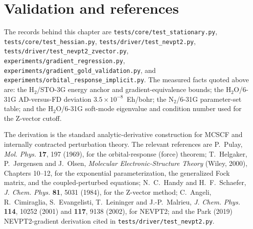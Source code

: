 \section{Validation and references}
\label{sec:chain-validation}

{\raggedright
The records behind this chapter are
\texttt{tests/core/test\_stationary.py},
\texttt{tests/core/test\_hessian.py},
\texttt{tests/driver/test\_nevpt2.py},
\texttt{tests/driver/test\_nevpt2\_zvector.py},
\texttt{experiments/gradient\_regression.py},
\texttt{experiments/gradient\_gold\_validation.py}, and
\texttt{experiments/orbital\_response\_implicit.py}.  The measured
facts quoted above are: the H$_2$/STO-3G energy anchor and
gradient-equivalence bounds; the H$_2$O/6-31G AD-versus-FD deviation
$3.5\times10^{-8}$~Eh/bohr; the N$_2$/6-31G parameter-set table; and
the H$_2$O/6-31G soft-mode eigenvalue and condition number used for the
Z-vector cutoff.\par}

The derivation is the standard analytic-derivative construction for
MCSCF and internally contracted perturbation theory.  The relevant
references are P.~Pulay, \emph{Mol. Phys.} \textbf{17}, 197 (1969), for
the orbital-response (force) theorem; T.~Helgaker, P.~J{\o}rgensen and
J.~Olsen, \emph{Molecular Electronic-Structure Theory} (Wiley, 2000),
Chapters 10--12, for the exponential parameterization, the generalized
Fock matrix, and the coupled-perturbed equations; N.~C.~Handy and
H.~F.~Schaefer, \emph{J. Chem. Phys.} \textbf{81}, 5031 (1984), for the
Z-vector method; C.~Angeli, R.~Cimiraglia, S.~Evangelisti,
T.~Leininger and J.-P.~Malrieu, \emph{J. Chem. Phys.}
\textbf{114}, 10252 (2001) and \textbf{117}, 9138 (2002), for NEVPT2;
and the Park (2019) NEVPT2-gradient derivation cited in
\texttt{tests/driver/test\_nevpt2.py}.
